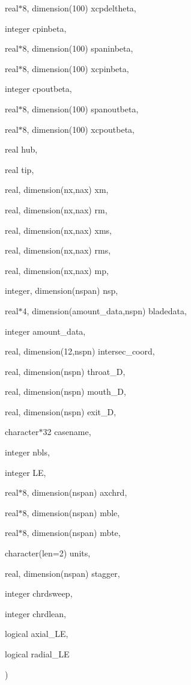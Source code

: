 {\begin{DoxyParamCaption}
\item[{real$\ast$8, dimension(100)}]{xcpdeltheta, }
\item[{integer}]{cpinbeta, }
\item[{real$\ast$8, dimension(100)}]{spaninbeta, }
\item[{real$\ast$8, dimension(100)}]{xcpinbeta, }
\item[{integer}]{cpoutbeta, }
\item[{real$\ast$8, dimension(100)}]{spanoutbeta, }
\item[{real$\ast$8, dimension(100)}]{xcpoutbeta, }
\item[{real}]{hub, }
\item[{real}]{tip, }
\item[{real, dimension(nx,nax)}]{xm, }
\item[{real, dimension(nx,nax)}]{rm, }
\item[{real, dimension(nx,nax)}]{xms, }
\item[{real, dimension(nx,nax)}]{rms, }
\item[{real, dimension(nx,nax)}]{mp, }
\item[{integer, dimension(nspan)}]{nsp, }
\item[{real$\ast$4, dimension(amount\+\_\+data,nspn)}]{bladedata, }
\item[{integer}]{amount\+\_\+data, }
\item[{real, dimension(12,nspn)}]{intersec\+\_\+coord, }
\item[{real, dimension(nspn)}]{throat\+\_\+D, }
\item[{real, dimension(nspn)}]{mouth\+\_\+D, }
\item[{real, dimension(nspn)}]{exit\+\_\+D, }
\item[{character$\ast$32}]{casename, }
\item[{integer}]{nbls, }
\item[{integer}]{L\+E, }
\item[{real$\ast$8, dimension(nspan)}]{axchrd, }
\item[{real$\ast$8, dimension(nspan)}]{mble, }
\item[{real$\ast$8, dimension(nspan)}]{mbte, }
\item[{character(len=2)}]{units, }
\item[{real, dimension(nspan)}]{stagger, }
\item[{integer}]{chrdsweep, }
\item[{integer}]{chrdlean, }
\item[{logical}]{axial\+\_\+\+L\+E, }
\item[{logical}]{radial\+\_\+\+L\+E}
\end{DoxyParamCaption}
)}\label{bladestack_8f90_a5dab74068855acf2e6917b70290ac7ec}


